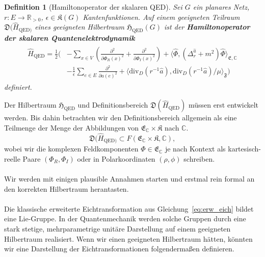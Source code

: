 \documentclass[11pt,a4paper,leqno]{report}
\newtheorem{definition}[theorem]{Definition}
\numberwithin{equation}{chapter}
\begin{document}
 \begin{definition}[Hamiltonoperator der skalaren QED]\label{def:QED-Hamilton}
 	Sei $G$ ein planares Netz, $r:E\to\mathbb{R}_{>0}$, $\epsilon\in\mathfrak{K}(G)$ Kantenfunktionen. Auf einem geeigneten Teilraum \(\mathfrak{D}(\hat{H}_{\mathrm{QED})}\) eines geeigneten Hilbertraum $\mathfrak{H}_{\mathrm{QED}}(G)$ ist der \textbf{Hamiltonoperator der skalaren Quantenelektrodynamik}
 	\begin{align}\label{eq:QED-Hamilton}
 		\begin{split}
 			\hat{H}_{\mathrm{QED}} = \frac{1}{2}\Biggl(&-\sum_{x\in V}\left(\frac{\partial^2}{\partial\Phi_R(x)^2} + \frac{\partial^2}{\partial\Phi_I(x)^2}\right) + \bigl\langle \hat{\Phi}, (\Delta_r^{\hat{a}} + m^2)\hat{\Phi} \bigr\rangle_{\mathfrak{E},\mathbb{C}} \\
 			&- \frac{1}{\epsilon}\sum_{e\in E}\frac{\partial^2}{\partial a(e)^2} + \bigl\langle \mathrm{div}_D(r^{-1}\hat{a}), \mathrm{div}_D(r^{-1}\hat{a})/\mu \bigr\rangle_{\mathfrak{F}}\Biggr)
 		\end{split}
 	\end{align}
 	definiert.
 \end{definition}
\noindent
\noindent
Der Hilbertraum $\mathfrak{H}_{\mathrm{QED}}$ und Definitionsbereich \(\mathfrak{D}(\hat{H}_{\mathrm{QED}})\) müssen erst entwickelt werden. Bis dahin betrachten wir den Definitionsbereich allgemein als eine Teilmenge der Menge der Abbildungen von $\mathfrak{E}_\mathbb{C}\times\mathfrak{K}$ nach $\mathbb{C}$. 
\[
\mathfrak{D}(\hat{H}_{\mathrm{QED})} \subset F(\mathfrak{E}_\mathbb{C}\times\mathfrak{K}, \mathbb{C}),
\]
wobei wir die komplexen Feldkomponenten $\Phi \in \mathfrak{E}_\mathbb{C}$ je nach Kontext als kartesisch-reelle Paare $(\Phi_R, \Phi_I)$ oder in Polarkoordinaten $(\rho, \phi)$ schreiben.
\\
\\
Wir werden mit einigen plausible Annahmen starten und erstmal rein formal an den korrekten Hilbertraum herantasten.
\\
\\
Die klassische erweiterte Eichtransformation aus Gleichung~\eqref{eq:erw_eich} bildet eine Lie-Gruppe.
In der Quantenmechanik werden solche Gruppen durch eine stark stetige, mehrparametrige unitäre Darstellung auf einem geeigneten Hilbertraum realisiert. Wenn wir einen geeigneten Hilbertraum hätten, könnten wir eine Darstellung der Eichtransformationen folgendermaßen definieren.
\end{document}

